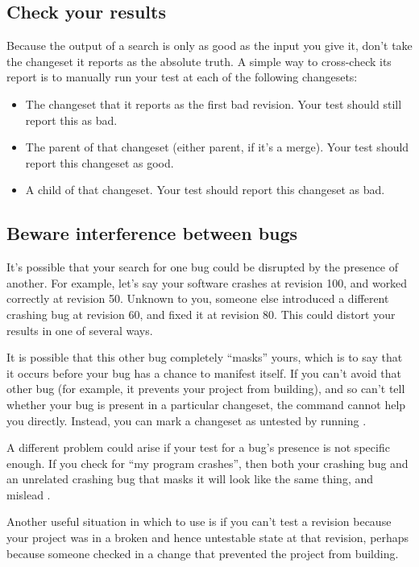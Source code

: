 \subsection{Check your results}

Because the output of a  search is only as good as the
input you give it, don't take the changeset it reports as the
absolute truth.  A simple way to cross-check its report is to manually
run your test at each of the following changesets:
\begin{itemize}
\item The changeset that it reports as the first bad revision.  Your
  test should still report this as bad.
\item The parent of that changeset (either parent, if it's a merge).
  Your test should report this changeset as good.
\item A child of that changeset.  Your test should report this
  changeset as bad.
\end{itemize}

\subsection{Beware interference between bugs}

It's possible that your search for one bug could be disrupted by the
presence of another.  For example, let's say your software crashes at
revision 100, and worked correctly at revision 50.  Unknown to you,
someone else introduced a different crashing bug at revision 60, and
fixed it at revision 80.  This could distort your results in one of
several ways.

It is possible that this other bug completely ``masks'' yours, which
is to say that it occurs before your bug has a chance to manifest
itself.  If you can't avoid that other bug (for example, it prevents
your project from building), and so can't tell whether your bug is
present in a particular changeset, the  command cannot
help you directly.  Instead, you can mark a changeset as untested by
running .

A different problem could arise if your test for a bug's presence is
not specific enough.  If you check for ``my program crashes'', then
both your crashing bug and an unrelated crashing bug that masks it
will look like the same thing, and mislead .

Another useful situation in which to use  is
if you can't test a revision because your project was in a broken and
hence untestable state at that revision, perhaps because someone
checked in a change that prevented the project from building.

